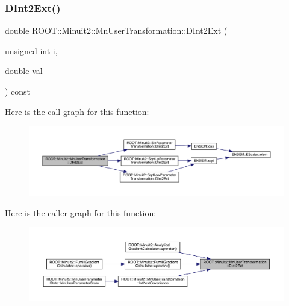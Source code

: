 \mbox{\label{classROOT_1_1Minuit2_1_1MnUserTransformation_a35938acd16a546d398ce1c00ffc98c44}} 
\subsubsection{\texorpdfstring{DInt2Ext()}{DInt2Ext()}\hspace{0.1cm}{\footnotesize\ttfamily [1/3]}}
{\footnotesize\ttfamily double R\+O\+O\+T\+::\+Minuit2\+::\+Mn\+User\+Transformation\+::\+D\+Int2\+Ext (\begin{DoxyParamCaption}\item[{unsigned int}]{i,  }\item[{double}]{val }\end{DoxyParamCaption}) const}

Here is the call graph for this function\+:
\nopagebreak
\begin{figure}[H]
\begin{center}
\leavevmode
\includegraphics[width=350pt]{d9/d98/classROOT_1_1Minuit2_1_1MnUserTransformation_a35938acd16a546d398ce1c00ffc98c44_cgraph}
\end{center}
\end{figure}
Here is the caller graph for this function\+:
\nopagebreak
\begin{figure}[H]
\begin{center}
\leavevmode
\includegraphics[width=350pt]{d9/d98/classROOT_1_1Minuit2_1_1MnUserTransformation_a35938acd16a546d398ce1c00ffc98c44_icgraph}
\end{center}
\end{figure}
\mbox{\label{classROOT_1_1Minuit2_1_1MnUserTransformation_a35938acd16a546d398ce1c00ffc98c44}} 
